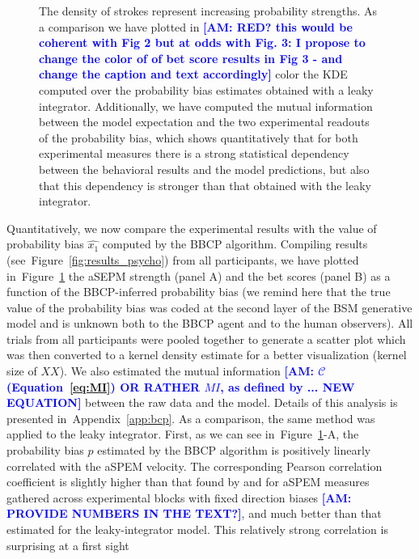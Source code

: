 \documentclass[12pt,english]{article}%
\newcommand{\Cc}{\mathcal{C}}
\newcommand{\citet}[1]{\textcite{#1}}
\newcommand{\seeFig}[1]{Figure~\ref{fig:#1}}
\newcommand{\seeEq}[1]{Equation~\ref{eq:#1}}
\newcommand{\seeApp}[1]{Appendix~\ref{app:#1}}
\newcommand{\AM}[1]{\textbf{\textcolor{blue}{[AM: #1]}}}
\begin{document}
\begin{figure}
{The density of strokes represent increasing probability strengths.
As a comparison we have plotted in \AM{RED? this would be coherent with Fig 2 but at odds with Fig. 3: I propose to change the color of of bet score results in Fig 3 - and change the caption and text accordingly} color the KDE computed over
the probability bias estimates obtained with a leaky integrator.
Additionally, we have computed the mutual information between the model expectation and the two experimental readouts of the probability bias, which
shows quantitatively that for both experimental measures 
there is a strong statistical dependency between 
the behavioral results and the model predictions, 
but also that this dependency is stronger than that obtained 
with the leaky integrator.
}
\label{fig:results_psycho_all}
\end{figure}
Quantitatively, we now compare the experimental results
with the value of probability bias $\hat{x_1}$
computed by the BBCP algorithm.
Compiling results (see~\seeFig{results_psycho}) from all participants,
we have plotted in~\seeFig{results_psycho_all}
the aSEPM strength (panel A) and the bet scores (panel B) as a function of the BBCP-inferred probability bias
(we remind here that the true value of the probability bias was coded at the second layer of the BSM generative model and is unknown both to the BBCP agent and to the human observers).
All trials from all participants were pooled together to generate a scatter plot 
which was then  converted to a kernel density estimate 
for a better visualization (kernel size of $XX$).
We also estimated the mutual information \AM{$\Cc$ (\seeEq{MI}) OR RATHER $MI$, as defined by ... NEW EQUATION}
between the raw data and the model.
Details of this analysis is presented in~\seeApp{bcp}.
As a comparison, the same method was applied to the leaky integrator.
First, as we can see in~\seeFig{results_psycho_all}-A,
the probability bias $\hat{p}$ estimated by the BBCP algorithm
is positively linearly correlated with the aSPEM velocity.
The corresponding Pearson correlation coefficient
is slightly higher than that found by
\citet{Montagnini2010} and \citet{Damasse18} for aSPEM measures gathered across experimental blocks with fixed direction biases \AM{PROVIDE NUMBERS IN THE TEXT?},
and much better than that estimated for the leaky-integrator model.
This relatively strong correlation is surprising at a first sight 
\end{document}
